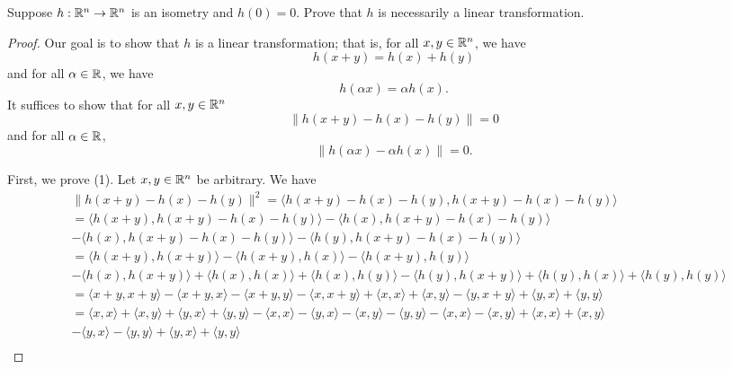 \documentclass[a4paper]{article}
\begin{document}
\begin{problem}
   Suppose \( h: \mathbb{R}^{n} \to \mathbb{R}^{n} \) is an isometry and \( h(0) = 0  \). Prove that \( h  \) is necessarily a linear transformation.
\end{problem}
\begin{proof}
    Our goal is to show that \( h  \) is a linear transformation; that is, for all \( x,y \in \mathbb{R}^{n} \), we have 
\[  h(x+y) = h(x) + h(y) \]
and for all \( \alpha \in \mathbb{R}  \), we have 
\[  h(\alpha x) = \alpha h(x). \]
It suffices to show that for all \( x,y \in \mathbb{R}^{n} \)
\[  \|h(x+y) - h(x) - h(y)\| = 0 \tag{1}  \]
and for all \( \alpha \in \mathbb{R} \), 
\[  \|h(\alpha x) - \alpha h(x) \| = 0. \tag{2}  \]

First, we prove (1). Let \( x,y \in \mathbb{R}^{n} \) be arbitrary. We have 
\begin{align*}
    &\|h(x+y) - h(x) - h(y)\|^{2} = \langle h(x+y) - h(x) - h(y) , h(x+y) - h(x) - h(y) \rangle \\
                                 &= \langle h(x+y)  , h(x+y) - h(x) - h(y) \rangle 
                                 - \langle h(x) , h(x+y) - h(x) - h(y) \rangle \\ 
                                 &- \langle h(x)  , h(x+y) - h(x) - h(y) \rangle 
                                 - \langle h(y) , h(x+y) - h(x) - h(y) \rangle \\
                                 &= \langle h(x+y) ,  h(x+y) \rangle - \langle h(x+y) , h(x) \rangle - \langle h(x+y) , h(y) \rangle \\ 
                                 &- \langle h(x) , h(x+y) \rangle + \langle h(x) , h(x) \rangle + \langle h(x) , h(y)  \rangle - \langle h(y) , h(x+y) \rangle + \langle h(y) , h(x) \rangle + \langle h(y) , h(y) \rangle  \\   
                                 &= \langle x + y , x + y \rangle - \langle x + y  , x  \rangle - \langle x + y  , y \rangle - \langle x  ,  x +y \rangle + \langle x , x \rangle + \langle x , y \rangle - \langle y , x + y  \rangle + \langle y , x \rangle + \langle y , y \rangle \\ 
                                 &= \langle x , x \rangle + \langle x , y \rangle + \langle y , x \rangle + \langle y , y \rangle - \langle x , x \rangle - \langle y , x \rangle - \langle x , y \rangle - \langle y , y \rangle - \langle x , x \rangle - \langle x , y \rangle + \langle x , x \rangle + \langle x , y \rangle  \\
                                 &- \langle y , x \rangle - \langle y , y \rangle + \langle y , x \rangle + \langle y , y \rangle \\

\end{align*}
\end{proof}
\end{document}
